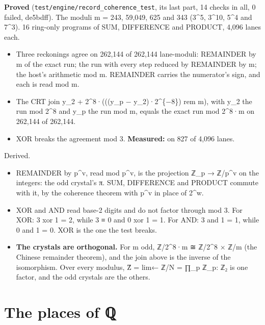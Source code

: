 \textbf{Proved} (\texttt{test/\allowbreak{}engine/\allowbreak{}record\_\allowbreak{}coherence\_\allowbreak{}test}, its last part, 14 checks in all, 0 failed, de5bdff). The moduli m = 243, 59,049, 625 and 343 (3\textasciicircum{}5, 3\textasciicircum{}10, 5\textasciicircum{}4 and 7\textasciicircum{}3). 16 ring-only programs of SUM, DIFFERENCE and PRODUCT, 4,096 lanes each.

\begin{itemize}
\item Three reckonings agree on 262,144 of 262,144 lane-moduli: REMAINDER by m of the exact run; the run with every step reduced by REMAINDER by m; the host's arithmetic mod m. REMAINDER carries the numerator's sign, and each is read mod m.
\item The CRT join y\_\allowbreak{}2 + 2\textasciicircum{}8·(((y\_\allowbreak{}p − y\_\allowbreak{}2)·2\textasciicircum{}\{−8\}) rem m), with y\_\allowbreak{}2 the run mod 2\textasciicircum{}8 and y\_\allowbreak{}p the run mod m, equals the exact run mod 2\textasciicircum{}8·m on 262,144 of 262,144.
\item XOR breaks the agreement mod 3. \textbf{Measured:} on 827 of 4,096 lanes.
\end{itemize}

Derived.

\begin{itemize}
\item REMAINDER by p\textasciicircum{}v, read mod p\textasciicircum{}v, is the projection ℤ\_\allowbreak{}p → ℤ/p\textasciicircum{}v on the integers: the odd crystal's π. SUM, DIFFERENCE and PRODUCT commute with it, by the coherence theorem with p\textasciicircum{}v in place of 2\textasciicircum{}w.
\item XOR and AND read base-2 digits and do not factor through mod 3. For XOR: 3 xor 1 = 2, while 3 ≡ 0 and 0 xor 1 = 1. For AND: 3 and 1 = 1, while 0 and 1 = 0. XOR is the one the test breaks.
\item \textbf{The crystals are orthogonal.} For m odd, ℤ/2\textasciicircum{}8·m ≅ ℤ/2\textasciicircum{}8 × ℤ/m (the Chinese remainder theorem), and the join above is the inverse of the isomorphism. Over every modulus, Ẑ = lim← ℤ/N = ∏\_\allowbreak{}p ℤ\_\allowbreak{}p: ℤ₂ is one factor, and the odd crystals are the others.
\end{itemize}

\section{\texorpdfstring{The places of ℚ}{The places of ℚ}}


